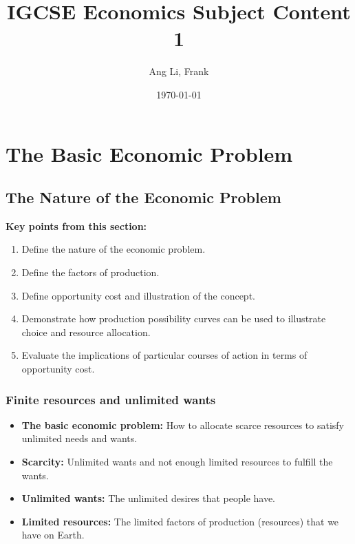 \documentclass[11pt, a4paper, openany]{book}
\title{\textbf{IGCSE Economics Subject Content 1}}
\author{Ang Li, Frank}
\date{\today}
\begin{document}
\fancyhf{}
\renewcommand{\headrulewidth}{2pt}
\renewcommand{\footrulewidth}{1pt}
\fancyhead[LE]{\leftmark}
\fancyhead[RO]{\nouppercase{\rightmark}}
\fancyfoot[LE, RO]{\thepage}

\maketitle
\tableofcontents

\chapter{The Basic Economic Problem}

\section{The Nature of the Economic Problem}

\begin{tcolorbox}
\textbf{Key points from this section:}
\begin{enumerate}\itemsep0em
	\item Define the nature of the economic problem.
	\item Define the factors of production.
	\item Define opportunity cost and illustration of the concept.
	\item Demonstrate how production possibility curves can be used to illustrate choice and resource allocation.
	\item Evaluate the implications of particular courses of action in terms of opportunity cost.
\end{enumerate}
\end{tcolorbox}

\subsection{Finite resources and unlimited wants}

\begin{itemize}\itemsep0em
	\item \textbf{The basic economic problem:} How to allocate scarce resources to satisfy unlimited needs and wants.
	\item \textbf{Scarcity:} Unlimited wants and not enough limited resources to fulfill the wants.
	\item \textbf{Unlimited wants:} The unlimited desires that people have.
	\item \textbf{Limited resources:} The limited factors of production (resources) that we have on Earth.
\end{itemize}
\end{document}
